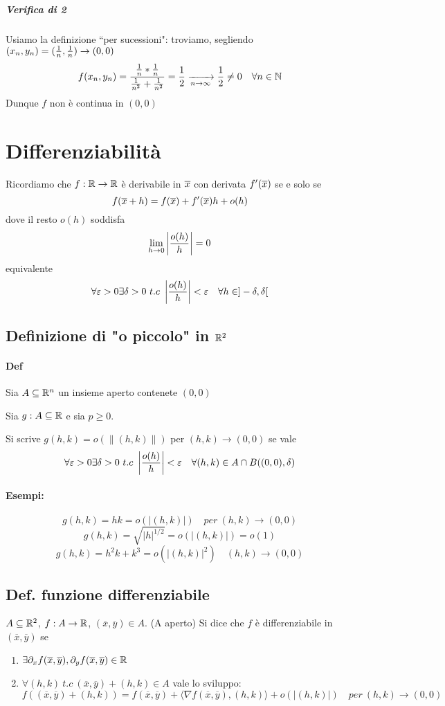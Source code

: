 \documentclass[a4paper]{article}
\begin{document}
\subparagraph{Verifica di 2} Usiamo la definizione ``per sucessioni": troviamo, segliendo $ (x_n,y_n) = ({1 \over n},{1 \over n}) \to (0,0)$
$$
f(x_n,y_n)= { {1 \over n}*{1 \over n} \over {1 \over n^2}+{1 \over n^2}} = {1 \over 2} \xrightarrow[n \to \infty] {} {1 \over 2} \neq 0 \quad \forall n \in \mathbb{N}
$$
Dunque $f$ non è continua in $(0,0)$

\section{ Differenziabilità }
Ricordiamo che $f: \mathbb{R} \to \mathbb{R}$ è derivabile in $\overline{x}$ con derivata $f'(\overline{x})$ se e solo se
$$
f(\overline{x}+h)=f(\overline{x})+f'(\overline{x})h+ o(h)
$$
dove il resto $o(h)$ soddisfa $$ \lim_{h \to 0} \left | {o(h) \over h } \right | =0 $$
equivalente
$$
\forall \varepsilon > 0 \exists \delta > 0 \ t.c\ \left | {o(h) \over h } \right | < \varepsilon \quad \forall h \in ]-\delta,\delta[
$$

\subsection{ Definizione di "o piccolo" in $\mathbb{R}^2$}
\paragraph{Def} Sia $A \subseteq \mathbb{R} ^n$ un insieme aperto contenete $(0,0)$

Sia $g:A \subseteq \mathbb{R}$ e sia $p \ge 0$.

Si scrive $g(h,k) = o( \| (h,k) \|)$ per $(h,k) \to (0,0)$ se vale
$$
\forall \varepsilon > 0 \exists \delta > 0\ t.c\ \left | {o(h) \over h } \right | < \varepsilon \quad \forall (h,k) \in A \cap B((0,0), \delta)
$$

\paragraph{Esempi:} 
$$
g(h,k) = hk = o (|(h,k)|) \quad per\  (h,k) \to (0,0)
$$
$$
g(h,k) = \sqrt{|h| ^ {1/2}} = o (|(h,k)|) = o(1)
$$
$$
g(h,k) = h^2k + k^3 = o (|(h,k)|^2) \quad (h,k) \to (0,0)
$$

\subsection { Def. funzione differenziabile}
$ A \subseteq \mathbb{R} ^2 $, $f:A \to \mathbb{R}$, $(\overline x, \overline y) \in A$. (A aperto) 
Si dice che $f$ è differenziabile in $(\overline x, \overline y)$ se
\begin{enumerate}
	\item $\exists \partial_x f (\overline x, \overline y), \partial_y f(\overline x, \overline y) \in \mathbb{R}$
	\item $\forall (h,k) \ t.c\ (\overline x, \overline y)+(h,k) \in A$ vale lo sviluppo:$$
		f((\overline x, \overline y)+(h,k))=f(\overline x, \overline y)+ \langle \nabla f(\overline x, \overline y),(h,k) \rangle + o (|(h,k)|) \quad per\ (h,k) \to (0,0)
		$$
\end{enumerate}
\end{document}
